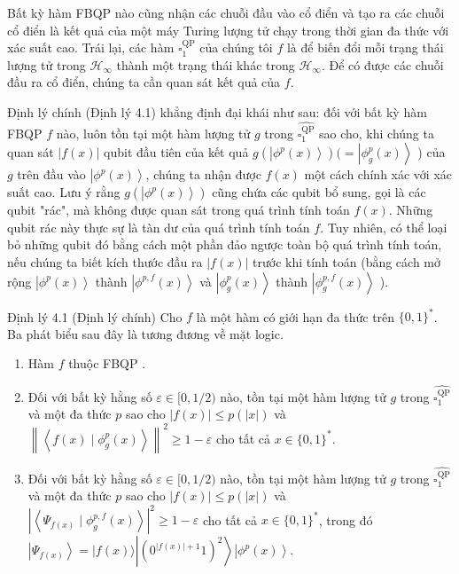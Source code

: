 \documentclass[10pt]{article}
\begin{document}
Bất kỳ hàm FBQP nào cũng nhận các chuỗi đầu vào cổ điển và tạo ra các chuỗi cổ điển là kết quả của một máy Turing lượng tử chạy trong thời gian đa thức với xác suất cao. Trái lại, các hàm $\square_{1}^{\mathrm{QP}}$ của chúng tôi $f$ là để biến đổi mỗi trạng thái lượng tử trong $\mathcal{H}_{\infty}$ thành một trạng thái khác trong $\mathcal{H}_{\infty}$. Để có được các chuỗi đầu ra cổ điển, chúng ta cần quan sát kết quả của $f$.

Định lý chính (Định lý 4.1) khẳng định đại khái như sau: đối với bất kỳ hàm FBQP $f$ nào, luôn tồn tại một hàm lượng tử $g$ trong $\widehat{\square_{1}^{\mathrm{QP}}}$ sao cho, khi chúng ta quan sát $|f(x)|$ qubit đầu tiên của kết quả $g\left(\left|\phi^{p}(x)\right\rangle\right)(= \left|\phi_{g}^{p}(x)\right\rangle$ ) của $g$ trên đầu vào $\left|\phi^{p}(x)\right\rangle$, chúng ta nhận được $f(x)$ một cách chính xác với xác suất cao. Lưu ý rằng $g\left(\left|\phi^{p}(x)\right\rangle\right)$ cũng chứa các qubit bổ sung, gọi là các qubit "rác", mà không được quan sát trong quá trình tính toán $f(x)$. Những qubit rác này thực sự là tàn dư của quá trình tính toán $f$. Tuy nhiên, có thể loại bỏ những qubit đó bằng cách một phần đảo ngược toàn bộ quá trình tính toán, nếu chúng ta biết kích thước đầu ra $|f(x)|$ trước khi tính toán (bằng cách mở rộng $\left|\phi^{p}(x)\right\rangle$ thành $\left|\phi^{p, f}(x)\right\rangle$ và $\left|\phi_{g}^{p}(x)\right\rangle$ thành $\left|\phi_{g}^{p, f}(x)\right\rangle$ ).

Định lý 4.1 (Định lý chính) Cho $f$ là một hàm có giới hạn đa thức trên $\{0,1\}^{*}$. Ba phát biểu sau đây là tương đương về mặt logic.

\begin{enumerate}
  \item Hàm $f$ thuộc FBQP .
  \item Đối với bất kỳ hằng số $\varepsilon \in[0,1 / 2)$ nào, tồn tại một hàm lượng tử $g$ trong $\widehat{\square_{1}^{\mathrm{QP}}}$ và một đa thức $p$ sao cho $|f(x)| \leq p(|x|)$ và $\left\|\left\langle f(x) \mid \phi_{g}^{p}(x)\right\rangle\right\|^{2} \geq 1-\varepsilon$ cho tất cả $x \in\{0,1\}^{*}$.
  \item Đối với bất kỳ hằng số $\varepsilon \in[0,1 / 2)$ nào, tồn tại một hàm lượng tử $g$ trong $\widehat{\square_{1}^{\mathrm{QP}}}$ và một đa thức $p$ sao cho $|f(x)| \leq p(|x|)$ và $\left|\left\langle\Psi_{f(x)} \mid \phi_{g}^{p, f}(x)\right\rangle\right|^{2} \geq 1-\varepsilon$ cho tất cả $x \in\{0,1\}^{*}$, trong đó $\left|\Psi_{f(x)}\right\rangle= |f(x)\rangle\left|\left(0^{|f(x)|+1} 1\right)^{2}\right\rangle\left|\phi^{p}(x)\right\rangle$.
\end{enumerate}
\end{document}
